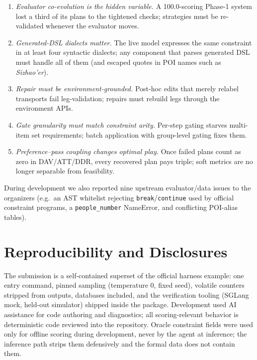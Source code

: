\documentclass[11pt,a4paper]{article}
\begin{document}
\begin{enumerate}[leftmargin=1.4em,itemsep=1pt]
\item \emph{Evaluator co-evolution is the hidden variable.} A 100.0-scoring
Phase-1 system lost a third of its plans to the tightened checks; strategies
must be re-validated whenever the evaluator moves.
\item \emph{Generated-DSL dialects matter.} The live model expresses the same
constraint in at least four syntactic dialects; any component that parses
generated DSL must handle all of them (and escaped quotes in POI names such
as \emph{Sizhao'er}).
\item \emph{Repair must be environment-grounded.} Post-hoc edits that merely
relabel transports fail leg-validation; repairs must rebuild legs through the
environment APIs.
\item \emph{Gate granularity must match constraint arity.} Per-step gating
starves multi-item set requirements; batch application with group-level
gating fixes them.
\item \emph{Preference--pass coupling changes optimal play.} Once failed
plans count as zero in DAV/ATT/DDR, every recovered plan pays triple; soft
metrics are no longer separable from feasibility.
\end{enumerate}

During development we also reported nine upstream evaluator/data issues to the
organizers (e.g.\ an AST whitelist rejecting \texttt{break}/\texttt{continue}
used by official constraint programs, a \texttt{people\_number} NameError, and
conflicting POI-alias tables).

\section{Reproducibility and Disclosures}

The submission is a self-contained superset of the official harness example:
one entry command, pinned sampling (temperature $0$, fixed seed), volatile
counters stripped from outputs, databases included, and the verification
tooling (SGLang mock, held-out simulator) shipped inside the package.
Development used AI assistance for code authoring and diagnostics; all
scoring-relevant behavior is deterministic code reviewed into the repository.
Oracle constraint fields were used only for offline scoring during
development, never by the agent at inference; the inference path strips them
defensively and the formal data does not contain them.
\end{document}
